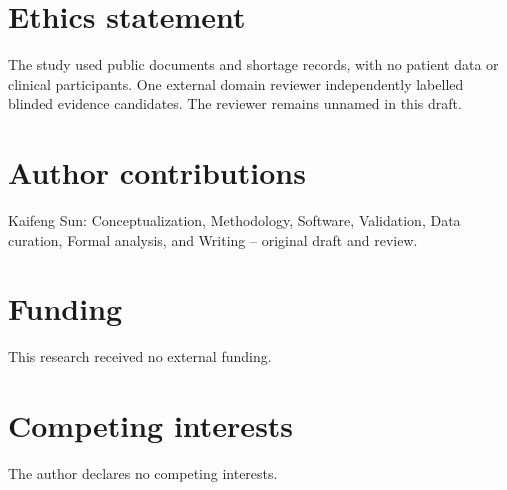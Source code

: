 \documentclass[11pt]{article}
\begin{document}
\section*{Ethics statement}
The study used public documents and shortage records, with no patient data or clinical participants. One external domain reviewer independently labelled blinded evidence candidates. The reviewer remains unnamed in this draft.

\section*{Author contributions}
Kaifeng Sun: Conceptualization, Methodology, Software, Validation, Data curation, Formal analysis, and Writing -- original draft and review.

\section*{Funding}
This research received no external funding.

\section*{Competing interests}
The author declares no competing interests.



\end{document}
